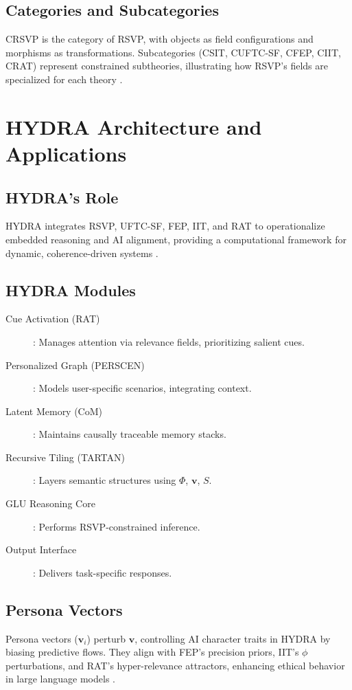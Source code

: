 \documentclass[12pt]{report}
\newcommand{\PhiRSVP}{\Phi}
\newcommand{\vRSVP}{\mathbf{v}}
\newcommand{\SRSVP}{S}
\begin{document}
\section{Categories and Subcategories}
CRSVP is the category of RSVP, with objects as field configurations and morphisms as transformations. Subcategories (CSIT, CUFTC-SF, CFEP, CIIT, CRAT) represent constrained subtheories, illustrating how RSVP’s fields are specialized for each theory \citep{RSVPMeta2025}.

\chapter{HYDRA Architecture and Applications}
\section{HYDRA’s Role}
HYDRA integrates RSVP, UFTC-SF, FEP, IIT, and RAT to operationalize embedded reasoning and AI alignment, providing a computational framework for dynamic, coherence-driven systems \citep{HYDRA2025}.

\section{HYDRA Modules}
\begin{description}
    \item[Cue Activation (RAT)]: Manages attention via relevance fields, prioritizing salient cues.
    \item[Personalized Graph (PERSCEN)]: Models user-specific scenarios, integrating context.
    \item[Latent Memory (CoM)]: Maintains causally traceable memory stacks.
    \item[Recursive Tiling (TARTAN)]: Layers semantic structures using \(\PhiRSVP\), \(\vRSVP\), \(\SRSVP\).
    \item[GLU Reasoning Core]: Performs RSVP-constrained inference.
    \item[Output Interface]: Delivers task-specific responses.
\end{description}

\section{Persona Vectors}
Persona vectors (\(\mathbf{v}_i\)) perturb \(\vRSVP\), controlling AI character traits in HYDRA by biasing predictive flows. They align with FEP’s precision priors, IIT’s \(\phi\) perturbations, and RAT’s hyper-relevance attractors, enhancing ethical behavior in large language models \citep{Chen2025, HYDRA2025}.
\end{document}
